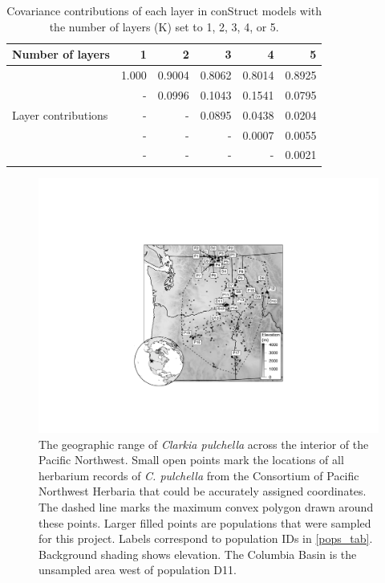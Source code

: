 \documentclass{article}
\begin{document}
\begin{table}[ht]
\centering
\caption[Covariance contributions of each layer in conStruct models]{Covariance contributions of each layer in conStruct models with the number of layers (K) set to 1, 2, 3, 4, or 5.}
\label{layer_contributions}
\begin{tabular}{lrrrrr}
\toprule
Number of layers & 1 & 2 & 3 & 4 & 5 \\
\midrule
\multirow{5}{*}{Layer contributions} & 1.000	& 0.9004	 &	0.8062    &	0.8014	&	0.8925 \\
& -	  &	0.0996   &	0.1043	  &	0.1541	&	0.0795 \\
& -	  &	-	     &	0.0895	  &	0.0438	&	0.0204 \\
& -	  &	-	     &	-	      &	0.0007  &	0.0055 \\
& -	  &	-	     &	-	      &	-	    &	0.0021 \\
\bottomrule
\end{tabular}
\end{table}

\clearpage

\begin{figure}[p]
\centering
\includegraphics[width=14cm]{figs/map_elev.pdf}
\caption[The geographic range of \textit{Clarkia pulchella} and sampling locations]{The geographic range of \textit{Clarkia pulchella} across the interior of the Pacific Northwest. Small open points mark the locations of all herbarium records of \textit{C. pulchella} from the Consortium of Pacific Northwest Herbaria that could be accurately assigned coordinates. The dashed line marks the maximum convex polygon drawn around these points. Larger filled points are populations that were sampled for this project. Labels correspond to population IDs in \autoref{pops_tab}. Background shading shows elevation. The Columbia Basin is the unsampled area west of population D11.}
\label{map_fig_popgen}
\end{figure}
\end{document}
